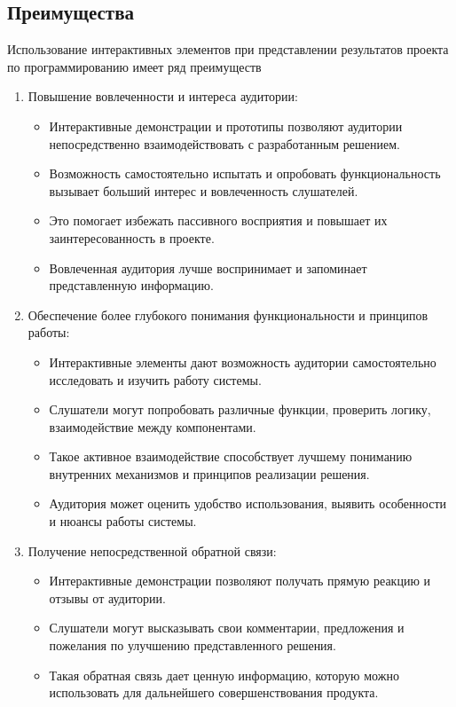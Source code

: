 \subsection*{Преимущества}
Использование интерактивных элементов при представлении результатов проекта по программированию имеет ряд преимуществ
\begin{enumerate}
    \item Повышение вовлеченности и интереса аудитории:
        \begin{itemize}
            \item Интерактивные демонстрации и прототипы позволяют аудитории непосредственно взаимодействовать с разработанным решением.
            \item Возможность самостоятельно испытать и опробовать функциональность вызывает больший интерес и вовлеченность слушателей.
            \item Это помогает избежать пассивного восприятия и повышает их заинтересованность в проекте.
            \item Вовлеченная аудитория лучше воспринимает и запоминает представленную информацию.
        \end{itemize}
    \item Обеспечение более глубокого понимания функциональности и принципов работы:
        \begin{itemize}
            \item Интерактивные элементы дают возможность аудитории самостоятельно исследовать и изучить работу системы.
            \item Слушатели могут попробовать различные функции, проверить логику, взаимодействие между компонентами.
            \item Такое активное взаимодействие способствует лучшему пониманию внутренних механизмов и принципов реализации решения.
            \item Аудитория может оценить удобство использования, выявить особенности и нюансы работы системы.
        \end{itemize}
    \item Получение непосредственной обратной связи:
        \begin{itemize}
            \item Интерактивные демонстрации позволяют получать прямую реакцию и отзывы от аудитории.
            \item Слушатели могут высказывать свои комментарии, предложения и пожелания по улучшению представленного решения.
            \item Такая обратная связь дает ценную информацию, которую можно использовать для дальнейшего совершенствования продукта.

\end{itemize}
\end{enumerate}
